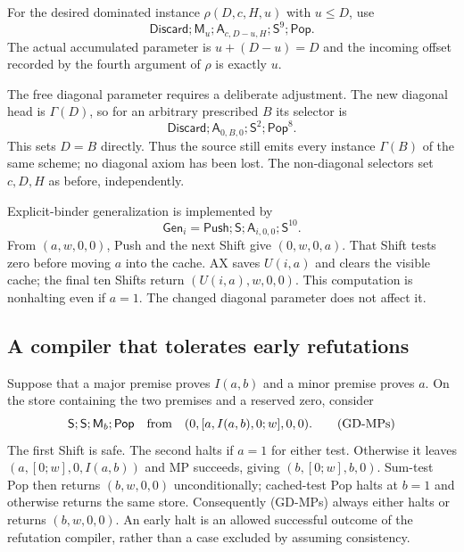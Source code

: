 For the desired dominated instance $\rho(D,c,H,u)$ with $u\le D$, use
\[
 \mathsf{Discard};\mathsf M_u;
 \mathsf A_{c,D-u,H};\mathsf S^9;\mathsf{Pop}.
\]
The actual accumulated parameter is $u+(D-u)=D$ and the incoming offset
recorded by the fourth argument of $\rho$ is exactly $u$.

The free diagonal parameter requires a deliberate adjustment.
The new diagonal head is $\Gamma(D)$, so for an arbitrary prescribed
$B$ its selector is
\[
 \mathsf{Discard};\mathsf A_{0,B,0};
                        \mathsf S^2;\mathsf{Pop}^8.      \tag{GD-Diag}\label{eq:gd-diag}
\]
This sets $D=B$ directly.  Thus the source still emits every instance
$\Gamma(B)$ of the same scheme; no diagonal axiom has been lost.
The non-diagonal selectors set $c,D,H$ as before, independently.

Explicit-binder generalization is implemented by
\[
 \mathsf{Gen}_i=
       \mathsf{Push};\mathsf S;\mathsf A_{i,0,0};\mathsf S^{10}.
                                                        \tag{GD-Gen}\label{eq:gd-gen}
\]
From $(a,w,0,0)$, Push and the next Shift give $(0,w,0,a)$.
That Shift tests zero before moving $a$ into the cache.  AX saves $U(i,a)$
and clears the visible cache; the final ten Shifts return
$(U(i,a),w,0,0)$.  This computation is nonhalting even if $a=1$.
The changed diagonal parameter does not affect it.

\subsection{A compiler that tolerates early refutations}

Suppose that a major premise proves $I(a,b)$ and a minor premise proves
$a$.  On the store containing the two premises and a reserved zero,
consider
\[
 \mathsf S;\mathsf S;\mathsf M_b;\mathsf{Pop}
       \quad\hbox{from}\quad(0,[a,I(a,b),0;w],0,0).
                                                        \tag{GD-MPs}\label{eq:gd-mps}
\]
The first Shift is safe.  The second halts if $a=1$ for either test.
Otherwise it leaves $(a,[0;w],0,I(a,b))$ and MP succeeds, giving
$(b,[0;w],b,0)$.  Sum-test Pop then returns $(b,w,0,0)$ unconditionally;
cached-test Pop halts at $b=1$ and otherwise returns the same store.
Consequently (GD-MPs) always either halts or returns $(b,w,0,0)$.
An early halt is an allowed successful outcome of the refutation
compiler, rather than a case excluded by assuming consistency.

